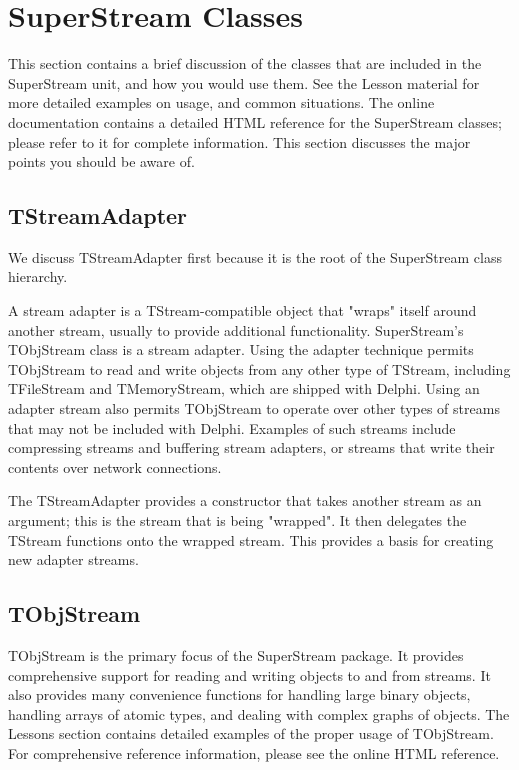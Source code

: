 \documentclass{report}
\begin{document}
\section{SuperStream Classes}

This section contains a brief discussion of the classes that are included in
the SuperStream unit, and how you would use them. See the Lesson material
for more detailed examples on usage, and common situations. The online
documentation contains a detailed HTML reference for the SuperStream
classes; please refer to it for complete information. This section discusses
the major points you should be aware of.

\subsection{TStreamAdapter}

We discuss TStreamAdapter first because it is the root 
of the SuperStream class hierarchy.

A stream adapter is a TStream-compatible object that "wraps" itself around
another stream, usually to provide additional functionality. SuperStream's
TObjStream class is a stream adapter. Using the adapter technique permits
TObjStream to read and write objects from any other type of TStream,
including TFileStream and TMemoryStream, which are shipped with Delphi.
Using an adapter stream also permits TObjStream to operate over other types
of streams that may not be included with Delphi. Examples of such streams
include compressing streams and buffering stream adapters, or streams that
write their contents over network connections.

The TStreamAdapter provides a constructor that takes another stream as an
argument; this is the stream that is being "wrapped". It then delegates the
TStream functions onto the wrapped stream. This provides a basis for
creating new adapter streams.

\subsection{TObjStream}

TObjStream is the primary focus of the SuperStream package.  It provides
comprehensive support for reading and writing objects to and from streams. 
It also provides many convenience functions for handling large binary
objects, handling arrays of atomic types, and dealing with complex graphs of
objects. The Lessons section contains detailed examples of the proper usage
of TObjStream. For comprehensive reference information, please see the
online HTML reference.
\end{document}
